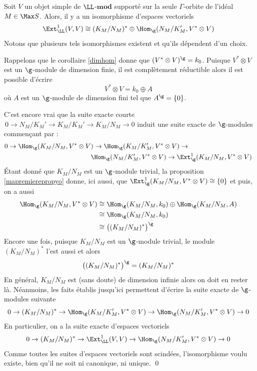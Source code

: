 \begin{Cor} \label{montroisiemeresultatyo} Soit $V$ un objet simple de $\LL$-$\mathbf{mod}$ supporté sur la seule $\Gamma$-orbite de l'idéal $M \in \Max S$. Alors, il y a un isomorphisme d'espaces vectoriels
$$ \Ext_\LL^1(V,V) \cong (K_M/N_M)^* \oplus \Hom_\g(N_M/K_M',V^* \otimes V) $$
Notons que plusieurs tels isomorphismes existent et qu'ils dépendent d'un choix.
\begin{pre} Rappelons que le corollaire \ref{dimhom} donne que $(V^* \otimes V)^\g = k_0$. Puisque $V^* \otimes V$ est un $\g$-module de dimension finie, il est complètement réductible alors il est possible d'écrire
$$ V^* \otimes V = k_0 \oplus A $$
où $A$ est un $\g$-module de dimension fini tel que $A^\g = \{0\}$. 

C'est encore vrai que la suite exacte courte $\, 0 \rightarrow N_M/K_M' \rightarrow K_M/K_M' \rightarrow K_M/N_M \rightarrow 0$ induit une suite exacte de $\g$-modules commençant par :
\begin{align*}
0 \rightarrow \Hom_\g(K_M/N_M,V^* \otimes V&) \rightarrow \Hom_\g(K_M/K_M',V^* \otimes V) \rightarrow \\
&\Hom_\g(N_M/K_M',V^* \otimes V) \rightarrow \Ext_\g^1(K_M/N_M,V^* \otimes V) 
\end{align*}
Étant donné que $K_M/N_M$ est un $\g$-module trivial, la proposition \ref{mapremierepropyo} donne, ici aussi, que $\Ext_\g^1(K_M/N_M,V^* \otimes V) \cong \{0\}$ et puis, on a aussi
\begin{align*}
\Hom_\g(K_M/N_M,V^* \otimes V) &\cong \Hom_\g(K_M/N_M,k_0) \oplus \Hom_\g(K_M/N_M,A)\\
&\cong \Hom_\g(K_M/N_M,k_0)\\
&\cong \big((K_M/N_M)^*\big)^\g
\end{align*}
Encore une fois, puisque $K_M/N_M$ est un $\g$-module trivial, le module $(K_M/N_M)^*$ l'est aussi et alors 
$$ \big((K_M/N_M)^*\big)^\g = (K_M/N_M)^* $$ 
En général, $K_M/N_M$ est (sans doute) de dimension infinie alors on doit en rester là. Néanmoins, les faits établis jusqu'ici permettent d'écrire la suite exacte de $\g$-modules suivante
$$ 0 \rightarrow (K_M/N_M)^* \rightarrow \Hom_\g(K_M/K_M',V^* \otimes V) \rightarrow \Hom_\g(N_M/K_M',V^* \otimes V) \rightarrow 0 $$
En particulier, on a la suite exacte d'espaces vectoriels 
$$ 0 \rightarrow (K_M/N_M)^* \rightarrow \Ext_\LL^1(V,V) \rightarrow \Hom_\g(N_M/K_M',V^* \otimes V) \rightarrow 0 $$
Comme toutes les suites d'espaces vectoriels sont scindées, l'isomorphisme voulu existe, bien qu'il ne soit ni canonique, ni unique. \qed
\end{pre}
\end{Cor}

